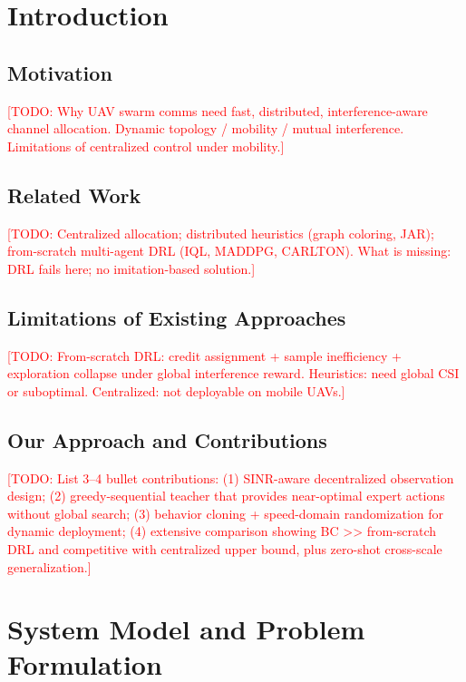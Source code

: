 \documentclass[journal]{IEEEtran}
\newcommand{\todo}[1]{\textcolor{red}{[TODO: #1]}}
\begin{document}
\section{Introduction}
\label{sec:intro}

\subsection{Motivation}
\todo{Why UAV swarm comms need fast, distributed, interference-aware channel
allocation. Dynamic topology / mobility / mutual interference. Limitations of
centralized control under mobility.}

\subsection{Related Work}
\todo{Centralized allocation; distributed heuristics (graph coloring, JAR);
from-scratch multi-agent DRL (IQL, MADDPG, CARLTON). What is missing: DRL fails
here; no imitation-based solution.}

\subsection{Limitations of Existing Approaches}
\todo{From-scratch DRL: credit assignment + sample inefficiency + exploration
collapse under global interference reward. Heuristics: need global CSI or
suboptimal. Centralized: not deployable on mobile UAVs.}

\subsection{Our Approach and Contributions}
\todo{List 3--4 bullet contributions:
(1) SINR-aware decentralized observation design;
(2) greedy-sequential teacher that provides near-optimal expert actions without
global search;
(3) behavior cloning + speed-domain randomization for dynamic deployment;
(4) extensive comparison showing BC >> from-scratch DRL and competitive with
centralized upper bound, plus zero-shot cross-scale generalization.}

\section{System Model and Problem Formulation}
\label{sec:model}
\end{document}
